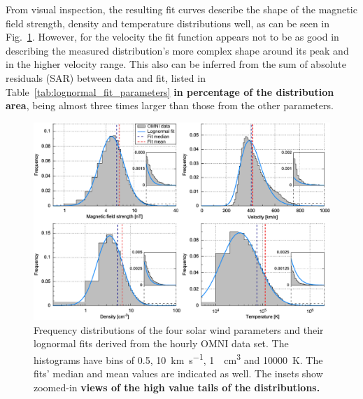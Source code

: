 From visual inspection, the resulting fit curves describe the shape of the magnetic field strength, density and temperature distributions well, as can be seen in Fig.~\ref{fig:histogram_fits_4_a_zoom_paper_pdfplot}. However, for the velocity the fit function appears not to be as good in describing the measured distribution’s more complex shape around its peak and in the higher velocity range. This also can be inferred from the sum of absolute residuals (SAR) between data and fit, listed in Table~\ref{tab:lognormal_fit_parameters} \textbf{in percentage of the distribution area}, being almost three times larger than those from the other parameters.
\begin{figure}
	\includegraphics[width=18cm]{figures/histogram_fits_4_a_zoom_paper_pdfplot.pdf}
	\caption{Frequency distributions of the four solar wind parameters and their lognormal fits derived from the hourly OMNI data set. The histograms have bins of \SI{0.5}{\nT}, \SI{10}{\km\per\s}, \SI{1}{\per\cm\cubed} and \SI{10000}{\K}. The fits' median and mean values are indicated as well. The insets show zoomed-in \textbf{views of the high value tails of the distributions. } }
	\label{fig:histogram_fits_4_a_zoom_paper_pdfplot}
\end{figure}


